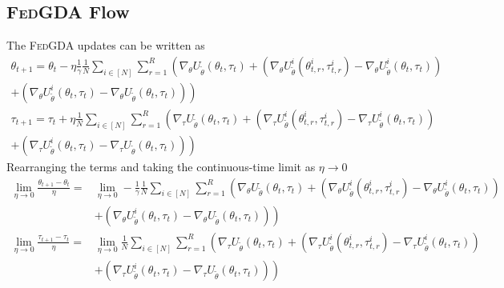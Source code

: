 \documentclass{article}
\newcommand{\fgda}{\textsc{FedGDA}\xspace}
\theoremstyle{definition}
\begin{document}
\subsection{\fgda Flow}
\label{ap:fgdaflow}
The \fgda updates can be written as
\begin{align*}
\theta_{t+1}=\theta_{t}-\eta\frac{1}{\gamma}\frac{1}{N}\sum_{i\in[N]}\sum_{r=1}^{R}\left(\nabla_{\theta}U_{\tilde\theta}(\theta_{t}, \tau_{t})+(\nabla_{\theta}U_{\tilde\theta}^i(\theta_{t,r}^i, \tau_{t,r}^i)-\nabla_{\theta}U_{\tilde\theta}^i(\theta_{t}, \tau_{t}))\right.\\
\left.+(\nabla_{\theta}U_{\tilde\theta}^i(\theta_{t}, \tau_{t})-\nabla_{\theta}U_{\tilde\theta}(\theta_{t}, \tau_{t}))\right)\\
\tau_{t+1}=\tau_{t}+\eta\frac{1}{N}\sum_{i\in[N]}\sum_{r=1}^{R}\left(\nabla_{\tau}U_{\tilde\theta}(\theta_{t}, \tau_{t})+(\nabla_{\tau}U_{\tilde\theta}^i(\theta_{t,r}^i, \tau_{t,r}^i)-\nabla_{\tau}U_{\tilde\theta}^i(\theta_{t}, \tau_{t}))\right.\\\left.+(\nabla_{\tau}U_{\tilde\theta}^i(\theta_{t}, \tau_{t})-\nabla_{\tau}U_{\tilde\theta}(\theta_{t}, \tau_{t}))\right)
\end{align*}
Rearranging the terms and taking the continuous-time limit as $\eta \to 0$
\begin{align*}
   \lim_{\eta\rightarrow0}\frac{\theta_{t+1}-\theta_{t}}{\eta}=& \lim_{\eta\rightarrow0}-\frac{1}{\gamma}\frac{1}{N}\sum_{i\in[N]}\sum_{r=1}^{R} \left(\nabla_{\theta}U_{\tilde\theta}(\theta_{t}, \tau_{t})+(\nabla_{\theta}U_{\tilde\theta}^i(\theta_{t,r}^i, \tau_{t,r}^i)-\nabla_{\theta}U_{\tilde\theta}^i(\theta_{t}, \tau_{t}))\right.\\&\left.+(\nabla_{\theta}U_{\tilde\theta}^i(\theta_{t}, \tau_{t})-\nabla_{\theta}U_{\tilde\theta}(\theta_{t}, \tau_{t}))\right)\\
   \lim_{\eta\rightarrow0}\frac{\tau_{t+1}-\tau_{t}}{\eta}=& \lim_{\eta\rightarrow0}\frac{1}{N}\sum_{i\in[N]}\sum_{r=1}^{R}\left(\nabla_{\tau}U_{\tilde\theta}(\theta_{t}, \tau_{t})+(\nabla_{\tau}U_{\tilde\theta}^i(\theta_{t,r}^i, \tau_{t,r}^i)-\nabla_{\tau}U_{\tilde\theta}^i(\theta_{t}, \tau_{t}))\right.\\&\left.+(\nabla_{\tau}U_{\tilde\theta}^i(\theta_{t}, \tau_{t})-\nabla_{\tau}U_{\tilde\theta}(\theta_{t}, \tau_{t}))\right)
\end{align*}
\end{document}
